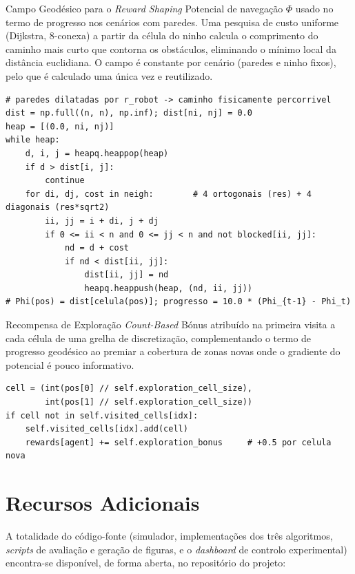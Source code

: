 \documentclass[12pt,reqno, twoside]{amsbook}
\makeatletter
\def\section{\@startsection{section}{1}%
      \z@{.5\linespacing\@plus.7\linespacing}{.25\linespacing}%
      {\normalfont\bfseries\flushleft}}
\theoremstyle{plain}
\numberwithin{equation}{chapter}
\numberwithin{section}{chapter}
\numberwithin{table}{chapter}
\numberwithin{figure}{chapter}
\makeatother
\begin{document}
\section{Campo Geodésico para o \textit{Reward Shaping}}
Potencial de navegação $\Phi$ usado no termo de progresso nos cenários com paredes. Uma pesquisa de custo uniforme (Dijkstra, 8-conexa) a partir da célula do ninho calcula o comprimento do caminho mais curto que contorna os obstáculos, eliminando o mínimo local da distância euclidiana. O campo é constante por cenário (paredes e ninho fixos), pelo que é calculado uma única vez e reutilizado.
\begin{lstlisting}[style=python, float=!htbp, caption={Campo de dist\^ancia geod\'esica ao ninho (Dijkstra sobre grelha).}]
# paredes dilatadas por r_robot -> caminho fisicamente percorrivel
dist = np.full((n, n), np.inf); dist[ni, nj] = 0.0
heap = [(0.0, ni, nj)]
while heap:
    d, i, j = heapq.heappop(heap)
    if d > dist[i, j]:
        continue
    for di, dj, cost in neigh:        # 4 ortogonais (res) + 4 diagonais (res*sqrt2)
        ii, jj = i + di, j + dj
        if 0 <= ii < n and 0 <= jj < n and not blocked[ii, jj]:
            nd = d + cost
            if nd < dist[ii, jj]:
                dist[ii, jj] = nd
                heapq.heappush(heap, (nd, ii, jj))
# Phi(pos) = dist[celula(pos)]; progresso = 10.0 * (Phi_{t-1} - Phi_t)
\end{lstlisting}

\section{Recompensa de Exploração \textit{Count-Based}}
Bónus atribuído na primeira visita a cada célula de uma grelha de discretização, complementando o termo de progresso geodésico ao premiar a cobertura de zonas novas onde o gradiente do potencial é pouco informativo.
\begin{lstlisting}[style=python, float=!htbp, caption={B\'onus de explora\c{c}\~ao por cobertura de c\'elulas novas.}]
cell = (int(pos[0] // self.exploration_cell_size),
        int(pos[1] // self.exploration_cell_size))
if cell not in self.visited_cells[idx]:
    self.visited_cells[idx].add(cell)
    rewards[agent] += self.exploration_bonus     # +0.5 por celula nova
\end{lstlisting}

\chapter{Recursos Adicionais}
\label{apx:resources}
A totalidade do código-fonte (simulador, implementações dos três algoritmos, \textit{scripts} de avaliação e geração de figuras, e o \textit{dashboard} de controlo experimental) encontra-se disponível, de forma aberta, no repositório do projeto:
\end{document}
